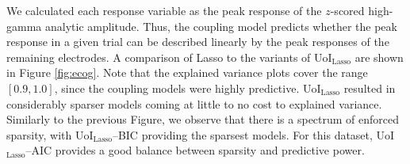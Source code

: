 \documentclass[11pt]{article}
\begin{document}
We calculated each response variable as the peak response of the $z$-scored high-gamma analytic amplitude. Thus, the coupling model predicts whether the peak response in a given trial can be described linearly by the peak responses of the remaining electrodes. A comparison of Lasso to the variants of UoI$_{\text{Lasso}}$ are shown in Figure \ref{fig:ecog}. Note that the explained variance plots cover the range $[0.9, 1.0]$, since the coupling models were highly predictive. UoI$_{\text{Lasso}}$ resulted in considerably sparser models coming at little to no cost to explained variance.  Similarly to the previous Figure, we observe that there is a spectrum of enforced sparsity, with UoI$_{\text{Lasso}}$--BIC providing the sparsest models. For this dataset, UoI$_{\text{Lasso}}$--AIC provides a good balance between sparsity and predictive power.
\end{document}
